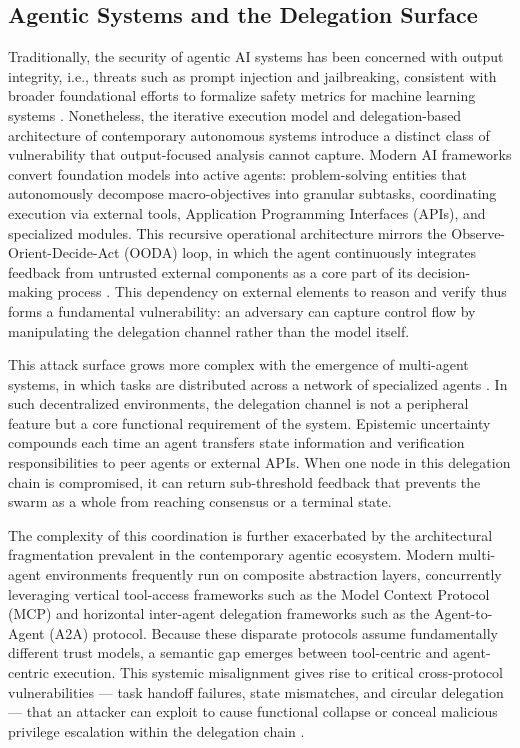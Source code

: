 \documentclass[conference]{IEEEtran}
\begin{document}
\subsection{Agentic Systems and the Delegation Surface}

Traditionally, the security of agentic AI systems has been concerned with output integrity, i.e., threats such as prompt injection and jailbreaking, consistent with broader foundational efforts to formalize safety metrics for machine learning systems \cite{hendrycks2021unsolved}. Nonetheless, the iterative execution model and delegation-based architecture of contemporary autonomous systems introduce a distinct class of vulnerability that output-focused analysis cannot capture. Modern AI frameworks convert foundation models into active agents: problem-solving entities that autonomously decompose macro-objectives into granular subtasks, coordinating execution via external tools, Application Programming Interfaces (APIs), and specialized modules. This recursive operational architecture mirrors the Observe-Orient-Decide-Act (OODA) loop, in which the agent continuously integrates feedback from untrusted external components as a core part of its decision-making process \cite{yang2026zombie, raghavan2025agentic}. This dependency on external elements to reason and verify thus forms a fundamental vulnerability: an adversary can capture control flow by manipulating the delegation channel rather than the model itself.

This attack surface grows more complex with the emergence of multi-agent systems, in which tasks are distributed across a network of specialized agents \cite{hong2023metagpt, qian2024chatdev}. In such decentralized environments, the delegation channel is not a peripheral feature but a core functional requirement of the system. Epistemic uncertainty compounds each time an agent transfers state information and verification responsibilities to peer agents or external APIs. When one node in this delegation chain is compromised, it can return sub-threshold feedback that prevents the swarm as a whole from reaching consensus or a terminal state.

The complexity of this coordination is further exacerbated by the architectural fragmentation prevalent in the contemporary agentic ecosystem. Modern multi-agent environments frequently run on composite abstraction layers, concurrently leveraging vertical tool-access frameworks such as the Model Context Protocol (MCP) and horizontal inter-agent delegation frameworks such as the Agent-to-Agent (A2A) protocol. Because these disparate protocols assume fundamentally different trust models, a semantic gap emerges between tool-centric and agent-centric execution. This systemic misalignment gives rise to critical cross-protocol vulnerabilities — task handoff failures, state mismatches, and circular delegation — that an attacker can exploit to cause functional collapse or conceal malicious privilege escalation within the delegation chain \cite{allegrini2025formalizing}.
\end{document}
